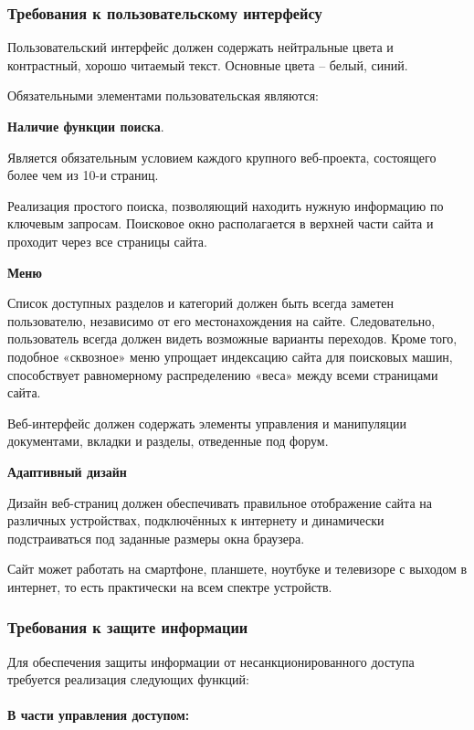 \documentclass[a4paper,14pt]{extarticle}
\begin{document}
\subsubsection{Требования к пользовательскому интерфейсу}
Пользовательский интерфейс должен содержать нейтральные цвета и
контрастный, хорошо читаемый текст. Основные цвета – белый, синий.

Обязательными элементами пользовательская  являются:

\textbf{Наличие функции поиска}.

 Является обязательным условием каждого крупного веб-проекта, состоящего более чем из 10-и страниц.
	
	Реализация простого поиска, позволяющий находить нужную информацию по ключевым запросам. Поисковое окно располагается в верхней части сайта и проходит через все страницы сайта.
	
\textbf{Меню}
	
	Список доступных разделов и категорий должен быть всегда заметен пользователю, независимо от его местонахождения на сайте. Следовательно, пользователь всегда должен видеть возможные варианты переходов.
	Кроме того, подобное «сквозное» меню упрощает индексацию сайта для поисковых машин, способствует равномерному распределению «веса» между всеми страницами сайта.
	
	Веб-интерфейс должен содержать элементы управления и манипуляции документами, вкладки и разделы, отведенные под форум.
	
	 \textbf{Адаптивный дизайн}
	
	Дизайн веб-страниц должен обеспечивать правильное отображение сайта на различных устройствах, подключённых к интернету и динамически подстраиваться под заданные размеры окна браузера.
	
	Сайт может работать на смартфоне, планшете, ноутбуке и телевизоре с выходом в интернет, то есть практически на всем спектре устройств.
	
\subsubsection{Требования к защите информации}
Для обеспечения защиты информации от несанкционированного доступа требуется реализация следующих функций:

\paragraph*{В части управления доступом:}
\end{document}

